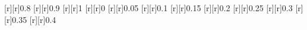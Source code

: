 \begin{psfrags}
[r][r]{0.8}%
[r][r]{0.9}%
[r][r]{1}%
[r][r]{0}%
[r][r]{0.05}%
[r][r]{0.1}%
[r][r]{0.15}%
[r][r]{0.2}%
[r][r]{0.25}%
[r][r]{0.3}%
[r][r]{0.35}%
[r][r]{0.4}%
%
%
\end{psfrags}%
%
